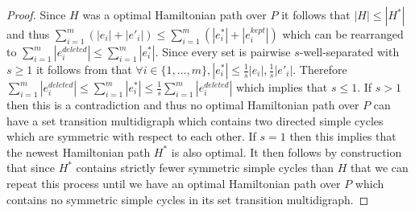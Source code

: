 \documentclass{article}
\theoremstyle{definition}
\begin{document}
\begin{proof}
    Since $H$ was a optimal Hamiltonian path over $P$ it follows that $|H| \leq |H^*|$ and thus $\sum_{i=1}^m (|e_i| + |e'_i|) \leq \sum_{i=1}^m (|e_i^*| + |e_i^{kept}|)$ which can be rearranged to $\sum_{i=1}^m |e_i^{deleted}| \leq \sum_{i=1}^m |e_i^*|$.
    Since every set is pairwise $s$-well-separated with $s \geq 1$ it follows from  that $\forall i \in \{1, \dots, m\}, |e_i^*| \leq \frac{1}{s} |e_i|, \frac{1}{s} |e'_i|$.
    Therefore $\sum_{i=1}^m |e_i^{deleted}| \leq \sum_{i=1}^m |e_i^*| \leq \frac{1}{s} \sum_{i=1}^m |e_i^{deleted}|$ which implies that $s \leq 1$.
    If $s > 1$ then this is a contradiction and thus no optimal Hamiltonian path over $P$ can have a set transition multidigraph which contains two directed simple cycles which are symmetric with respect to each other.
    If $s = 1$ then this implies that the newest Hamiltonian path $H^*$ is also optimal.
    It then follows by construction that since $H^*$ contains strictly fewer symmetric simple cycles than $H$ that we can repeat this process until we have an optimal Hamiltonian path over $P$ which contains no symmetric simple cycles in its set transition multidigraph.
\end{proof}
\end{document}

